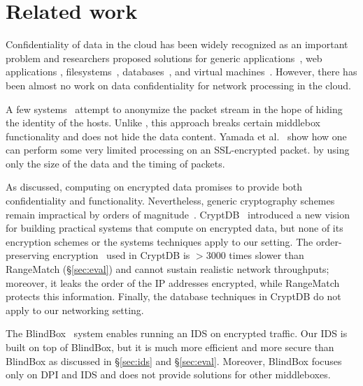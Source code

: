 
\section{Related work}\label{sec:related}

Confidentiality of data in the cloud has been widely recognized as an important problem and researchers proposed solutions for generic applications~\cite{Baumann:Haven}, web applications \cite{giffin:hails, Mylar},  filesystems~\cite{blaze:cfs, kallahalla:plutus, goh:sirius},  databases~\cite{popa:cryptdb},  and virtual machines~\cite{Zhang:CloudVisor}. However, there has been almost no work on data confidentiality for network processing in the cloud. 

A few systems~\cite{Vern:Anonymize03, Vern:Anonymize06} attempt to anonymize the packet stream in the hope of hiding the identity of the hosts.
Unlike \sys, this approach breaks certain middlebox functionality and does not hide the data content.
Yamada et al.~\cite{Yamada_IDS} show how one can perform some very limited processing on an 
SSL-encrypted packet.
     by using only the size of the data and the timing of packets. %


As discussed, computing on encrypted data promises to provide both confidentiality and functionality. Nevertheless, generic cryptography schemes~\cite{BSW11,gentry:fhe} remain impractical by orders of magnitude~\cite{gentry:fhe-aes-eprint}.
CryptDB~\cite{popa:cryptdb} introduced a new vision for building practical systems that compute on encrypted data, but none of its encryption schemes or the systems techniques  apply to our setting.  The order-preserving encryption~\cite{boldyreva:ope} used in CryptDB is 
 $>3000$ times slower than RangeMatch (\S\ref{sec:eval}) and cannot sustain realistic network throughputs; moreover, it leaks the order of the IP addresses encrypted, while RangeMatch protects this information. %
 Finally, the database techniques in CryptDB do not apply to our networking setting. 

The BlindBox~\cite{blindbox} system enables running an IDS on encrypted traffic. Our IDS is built on top of BlindBox, but it is much more efficient and more secure than BlindBox as discussed in \S\ref{sec:ids} and \S\ref{sec:eval}. Moreover, BlindBox focuses only on DPI and IDS and does not provide solutions for other middleboxes. %


